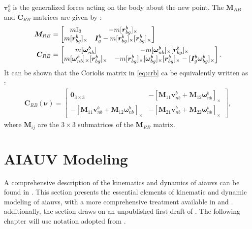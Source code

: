 $\bm{\tau}_{b}^b$ is the generalized forces acting on the body about the new
point. The $\bm{M}_{RB}$ and $\bm{C}_{RB}$ matrices are given by \cite{fossen2021}:
\begin{subequations}
\begin{align}
    \bm{M}_{RB} &= \begin{bmatrix}
        m \mathbb{I}_3 & - m [\bm{r}_{bg}^b]_{\times} \\
        m [\bm{r}_{bg}^b]_{\times} & \bm{I}_g^b - m [\bm{r}_{bg}^b]_{\times}[\bm{r}_{bg}^b]_{\times}
    \end{bmatrix} \\
    \bm{C}_{RB} &= \begin{bmatrix}
        m [\bm{\omega}_{nb}^b] & -m [\bm{\omega}_{nb}^b]_{\times}[\bm{r}_{bg}^b]_{\times} \\
        m [\bm{\omega}_{nb}^b]_{\times}[\bm{r}_{bg}^b]_{\times} & 
        -m [ \bm{r}_{bg}^b ]_{\times} [ \bm{\omega}_{bg}^b ]_{\times} [ \bm{r}_{bg}^b ]_{\times} -
        [ \bm{I}_g^b \bm{\omega}_{bg}^b ]_{\times}
    \end{bmatrix}. \label{eq:crb}
\end{align}
\end{subequations}
It can be shown that the Coriolis matrix in \autoref{eq:crb} ca be equivalently
written as \cite{sagatun1991}:
\begin{align}
    \bm{C}_{RB}(\bm\nu) = \begin{bmatrix}
        \bm{0}_{3 \times 3} & 
        -\left[\bm{M}_{11}\bm{v}_{nb}^{b} + \bm{M}_{12}\bm{\omega}_{nb}^b \right]_{\times} \\
        -\left[\bm{M}_{11}\bm{v}_{nb}^{b} + \bm{M}_{12}\bm{\omega}_{nb}^b \right]_{\times} &
        -\left[\bm{M}_{21}\bm{v}_{nb}^{b} + \bm{M}_{22}\bm{\omega}_{nb}^b \right]_{\times}
    \end{bmatrix},
\end{align}
where $\bm{M}_{ij}$ are the $3 \times 3$ submatrices of the $\bm{M}_{RB}$ matrix.

\newpage
\section{AIAUV Modeling}

A comprehensive description of the kinematics and dynamics of
\gls{aiauv}s can be found in \cite{schmidt2018}.
This section presents the essential elements of kinematic and dynamic modeling of \gls{aiauv}s, with a more comprehensive
treatment available in \cite{from2014} and \cite{schmidt2018}.
additionally, the section draws on an unpublished
first draft of \cite{schmidt2018}. The following chapter will use notation adopted from
\cite{from2014}.

